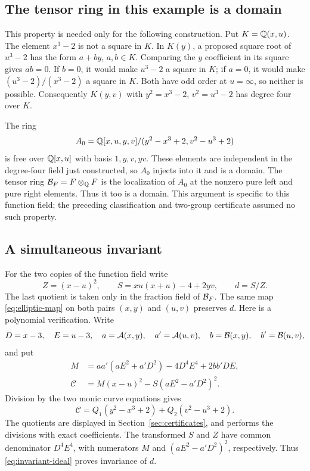 \subsection{The tensor ring in this example is a domain}
This property is needed only for the following construction. Put
$K=\mathbb Q(x,u)$. The element $x^3-2$ is not a square in $K$.
In $K(y)$, a proposed square root of $u^3-2$ has the form
$a+by$, $a,b\in K$. Comparing the $y$ coefficient in its square
gives $ab=0$. If $b=0$, it would make $u^3-2$ a square in $K$;
if $a=0$, it would make $(u^3-2)/(x^3-2)$ a square in $K$.
Both have odd order at $u=\infty$, so neither is possible.
Consequently $K(y,v)$ with $y^2=x^3-2$, $v^2=u^3-2$
has degree four over $K$.

The ring
\[
 A_0=\mathbb Q[x,u,y,v]/(y^2-x^3+2,v^2-u^3+2)
\]
is free over $\mathbb Q[x,u]$ with basis $1,y,v,yv$. These elements
are independent in the degree-four field just constructed, so
$A_0$ injects into it and is a domain. The tensor ring
$\mathcal B_F=F\otimes_\mathbb Q F$ is the localization of $A_0$ at the
nonzero pure left and pure right elements. Thus it too is a domain.
This argument is specific to this function field; the preceding
classification and two-group certificate assumed no such property.

\subsection{A simultaneous invariant}
For the two copies of the function field write
\[
 Z=(x-u)^2,\qquad S=xu(x+u)-4+2yv,
 \qquad d=S/Z.
\]
The last quotient is taken only in the fraction field of $\mathcal B_F$.
The same map \eqref{eq:elliptic-map} on both pairs $(x,y)$ and
$(u,v)$ preserves $d$. Here is a polynomial verification.
Write
\[
 D=x-3,\quad E=u-3,\quad a=\mathcal A(x,y),\quad a'=\mathcal A(u,v),
 \quad b=\mathcal B(x,y),\quad b'=\mathcal B(u,v),
\]
and put
\begin{equation}\label{eq:invariant-polynomial}
 \begin{split}
 M&=aa'(aE^2+a'D^2)-4D^4E^4+2bb'DE,\\
 \mathcal C&=M(x-u)^2-S(aE^2-a'D^2)^2.
 \end{split}
\end{equation}
Division by the two monic curve equations gives
\begin{equation}\label{eq:invariant-ideal}
 \mathcal C=Q_1(y^2-x^3+2)+Q_2(v^2-u^3+2).
\end{equation}
The quotients are displayed in Section~\ref{sec:certificates}, and
 performs the divisions with exact coefficients.
The transformed $S$ and $Z$ have common denominator $D^4E^4$,
with numerators $M$ and $(aE^2-a'D^2)^2$, respectively.
Thus \eqref{eq:invariant-ideal} proves invariance of $d$.


